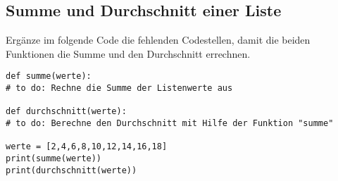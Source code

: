 \subsection{Summe und Durchschnitt einer Liste }
Ergänze im folgende Code die fehlenden Codestellen, damit die beiden Funktionen die Summe und den Durchschnitt errechnen.
\begin{lstlisting}
def summe(werte):
# to do: Rechne die Summe der Listenwerte aus
	
def durchschnitt(werte):
# to do: Berechne den Durchschnitt mit Hilfe der Funktion "summe"

werte = [2,4,6,8,10,12,14,16,18]
print(summe(werte))
print(durchschnitt(werte))
\end{lstlisting}
